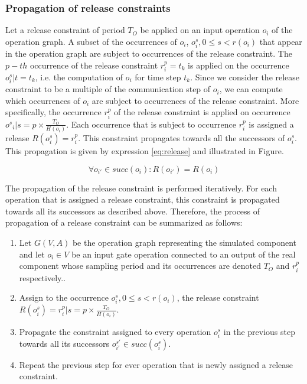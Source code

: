 \subsubsection{Propagation of release constraints}

Let a release constraint of period $T_O$ be applied on an input operation $o_i$ of the operation graph. A subset of the occurrences of $o_i$, $o^s_i, 0 \leq s < r(o_i)$ that appear in the operation graph are subject to occurrences of the release constraint. The $p-th$ occurrence of the release constraint $r_i^p = t_k$ is applied on the occurrence $o^s_i | t = t_k$, i.e. the computation of $o_i$ for time step $t_k$. Since we consider the release constraint to be a multiple of the communication step of ${o_i}$, we can compute which occurrences of $o_i$ are subject to occurrences of the release constraint. More specifically, the occurrence $r_i^p$ of the release constraint is applied on occurrence ${o^s}_i | s = p \times \frac{T_O}{H(o_i)}$. Each occurrence that is subject to occurrence $r_i^p$ is assigned a release $R(o^s_i) = r_i^p$. This constraint propagates towards all the successors of $o^s_i$. This propagation is given by expression \ref{eq:release} and illustrated in Figure.

\begin{equation}
\forall o_{i'} \in succ(o_i): R(o_{i'}) = R(o_i)
\label{eq:release}
\end{equation}

The propagation of the release constraint is performed iteratively. For each operation that is assigned a release constraint, this constraint is propagated towards all its successors as described above. Therefore, the process of propagation of a release constraint can be summarized as follows:

\begin{enumerate}
\item Let $G(V,A)$ be the operation graph representing the simulated component and let $o_i \in  V$ be an input gate operation connected to an output of the real component whose sampling period and its occurrences are denoted $T_O$ and $r_i^p$ respectively..
\item Assign to the occurrence $o_i^s, 0 \leq s < r(o_i)$, the release constraint $R(o_i^s) = r_i^p | s = p \times \frac{T_O}{H(o_i)}$.
\item Propagate the constraint assigned to every operation $o_i^s$ in the previous step towards all its successors $o_{i'}^{s'} \in succ(o_i^s)$.
\item Repeat the previous step for ever operation that is newly assigned a release constraint.
\end{enumerate}

